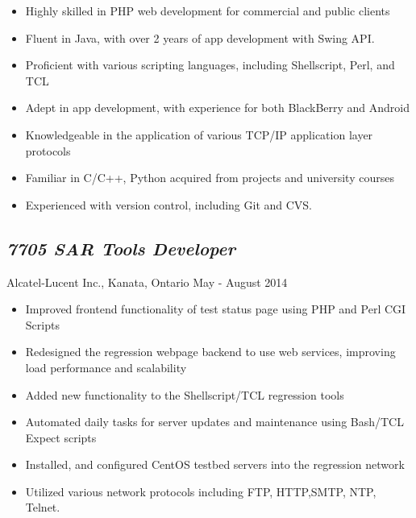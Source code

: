 \documentclass[10pt]{article}
\begin{document}
\begin{minipage}[t]{0.84\linewidth} 
	\begin{itemize}
		\item Highly skilled in PHP web development for commercial and public clients
		\item Fluent in Java, with over 2 years of app development with Swing API.
		\item Proficient with various scripting languages, including Shellscript, Perl, and TCL	
		\item Adept in app development, with experience for both BlackBerry and Android
		\item Knowledgeable in the application of various TCP/IP application layer protocols
		\item Familiar in C/C++, Python acquired from projects and university courses
		\item Experienced with version control, including Git and CVS.
	\end{itemize}

	\subsection*{\textit{7705 SAR Tools Developer}} \vspace{-6pt} 
		Alcatel-Lucent Inc., Kanata, Ontario \hspace{175pt} May - August 2014
		\begin{itemize}
			\item Improved frontend functionality of test status page using PHP and Perl CGI Scripts		
			\item Redesigned the regression webpage backend to use web services, improving load performance and scalability			
			\item Added new functionality to the Shellscript/TCL regression tools
			\item Automated daily tasks for server updates and maintenance using Bash/TCL Expect scripts
			\item Installed, and configured CentOS testbed servers into the regression network
			\item Utilized various network protocols including FTP, HTTP,SMTP, NTP, Telnet.
		\end{itemize}


\end{minipage}
\end{document}
